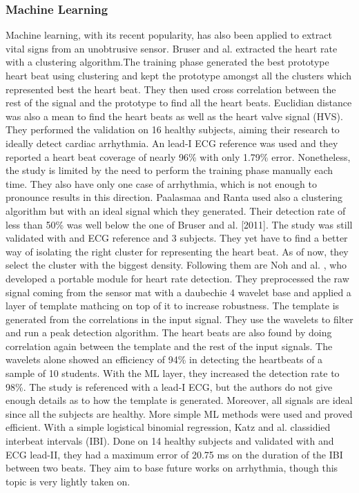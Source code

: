 \documentclass[twoside,onecolumn]{article}
\begin{document}
\subsubsection{Machine Learning}
Machine learning, with its recent popularity, has also been applied to extract vital signs from an unobtrusive sensor.
Bruser and al. \cite{bruser_adaptive_2011} extracted the heart rate with a clustering algorithm.The training phase generated the best prototype heart beat using clustering and kept the prototype amongst all the clusters which represented best the heart beat. They then used cross correlation between the rest of the signal and the prototype to find all the heart beats. Euclidian distance was also a mean to find the heart beats as well as the heart valve signal (HVS). They performed the validation on 16 healthy subjects, aiming their research to ideally detect cardiac arrhythmia. An lead-I ECG reference was used and they reported a heart beat coverage of nearly 96\% with only 1.79\% error. Nonetheless, the study is limited by the need to perform the training phase manually each time. They also have only one case of arrhythmia, which is not enough to pronounce results in this direction. 
Paalasmaa and Ranta \cite{paalasmaa_detecting_2008} used also a clustering algorithm but with an ideal signal which they generated. Their detection rate of less than 50\% was well below the one of Bruser and al. [2011]. The study was still validated with and ECG reference and 3 subjects. They yet have to find a better way of isolating the right cluster for representing the heart beat. As of now, they select the cluster with the biggest density. 
Following them are Noh and al. \cite{noh_development_2010}, who developed a portable module for heart rate detection. They preprocessed the raw signal coming from the sensor mat with a daubechie 4 wavelet base and applied a layer of template mathcing on top of it to increase robustness. The template is generated from the correlations in the input signal. They use the wavelets to filter and run a peak detection algorithm. The heart beats are also found by doing correlation again between the template and the rest of the input signals. The wavelets alone showed an efficiency of 94\% in detecting the heartbeats of a sample of 10 students. With the ML layer, they increased the detection rate to 98\%. The study is referenced with a lead-I ECG, but the authors do not give enough details as to how the template is generated. Moreover, all signals are ideal since all the subjects are healthy. More simple ML methods were used and proved efficient. With a simple logistical binomial regression, Katz and al. \cite{katz_contact-free_2016} classidied interbeat intervals (IBI). Done on 14 healthy subjects and validated with and ECG lead-II, they had a maximum error of 20.75 ms on the duration of the IBI between two beats. They aim to base future works on arrhythmia, though this topic is very lightly taken on.
\end{document}
